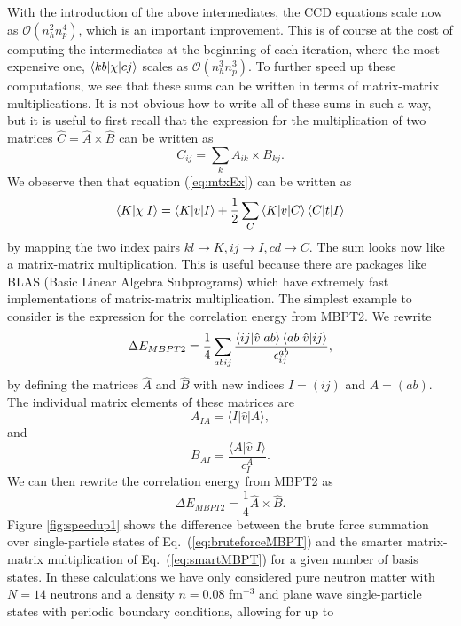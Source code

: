   With the introduction of the above intermediates, the CCD equations scale now as $\mathcal{O}(n_{h}^{2}
  n_{p}^{4})$, which is an important improvement. This is of
  course at the cost of computing the intermediates at the beginning
  of each iteration, where the most expensive one, $\braket{kb| \chi |cj}$ scales as $\mathcal{O}(n_{h}^{3} n_{p}^{3})$. To
  further speed up these computations, we see that these sums can be
  written in terms of  matrix-matrix multiplications. It is not obvious how to
  write all of these sums in such a way, but it is useful to first
  recall that the expression for the multiplication of two matrices $\hat{C} =
  \hat{A}\times \hat{B}$ can be written as
  \begin{equation}
  C_{ij} = \sum_{k} A_{ik} \times B_{kj}.
  \end{equation}
  We obeserve then  that equation (\ref{eq:mtxEx}) can be written as
  \[
  \braket{K| \chi |I} = \braket{K|v|I} + \frac{1}{2} \sum_{C}
  \braket{K|v|C} \braket{C|t|I}
  \]
  by mapping the two index pairs $kl \to K, ij \to I, cd \to C$. The sum looks now 
like a matrix-matrix multiplication. This is
  useful because there are packages like BLAS (Basic Linear Algebra
  Subprograms) \cite{blas} which have extremely fast implementations of
  matrix-matrix multiplication.
  The simplest example to consider is the expression for the correlation energy from MBPT2. We rewrite 
  \begin{equation}\label{eq:bruteforceMBPT}
  \Delta E_{MBPT2} = \frac{1}{4}\sum_{abij} \frac{\braket{ij|\hat{v}|ab}\braket{ab|\hat{v}|ij}}{ \epsilon_{ij}^{ab}},
\end{equation}
by defining the matrices $\hat{A}$ and $\hat{B}$ with new indices $I=(ij)$ and $A=(ab)$. The individual matrix elements of these matrices are 
\[
A_{IA} = \langle I \vert \hat{v} \vert A \rangle,
\]
and 
\[
B_{AI} = \frac{\langle A \vert \hat{v} \vert I \rangle}{\epsilon^A_I}.
\]
We can then rewrite the correlation energy from MBPT2 as
\begin{equation}\label{eq:smartMBPT}
  \Delta E_{MBPT2} = \frac{1}{4}\hat{A}\times \hat{B}.
\end{equation}
Figure \ref{fig:speedup1} shows the difference between the brute force summation over single-particle states
of Eq.~(\ref{eq:bruteforceMBPT}) and the smarter matrix-matrix multiplication of Eq.~(\ref{eq:smartMBPT}) for a given number  of basis states.
In these calculations we have only considered pure neutron matter with $N=14$ neutrons and a density $n=0.08$ fm$^{-3}$ and plane wave single-particle states with periodic boundary conditions, allowing for up to 

